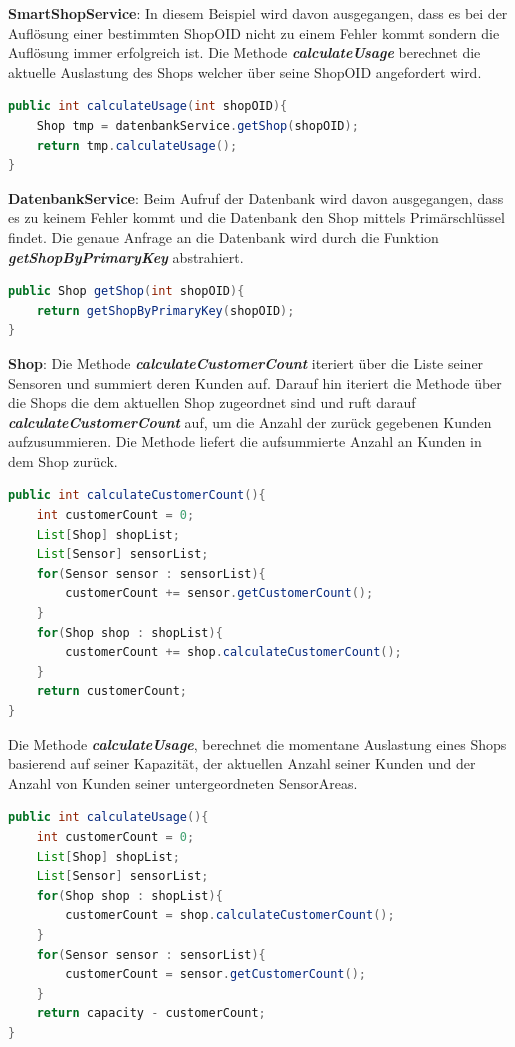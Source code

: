\documentclass[runningheads]{llncs}
\begin{document}
\textbf{SmartShopService}: In diesem Beispiel wird davon ausgegangen, dass es bei der Auflösung einer bestimmten ShopOID nicht zu einem Fehler kommt sondern die Auflösung immer erfolgreich ist.
Die Methode \textbf{\textit{calculateUsage}} berechnet die aktuelle Auslastung des Shops welcher über seine ShopOID angefordert wird.
\begin{lstlisting}[language=Java, basicstyle=\scriptsize]
public int calculateUsage(int shopOID){
	Shop tmp = datenbankService.getShop(shopOID);
	return tmp.calculateUsage();
}
\end{lstlisting}


\textbf{DatenbankService}: Beim Aufruf der Datenbank wird davon ausgegangen, dass es zu keinem Fehler kommt und die Datenbank den Shop mittels Primärschlüssel findet.
Die genaue Anfrage an die Datenbank wird durch die Funktion \textbf{\textit{getShopByPrimaryKey}} abstrahiert.
\begin{lstlisting}[language=Java, basicstyle=\scriptsize]
public Shop getShop(int shopOID){
	return getShopByPrimaryKey(shopOID);
}
\end{lstlisting}

\break
\textbf{Shop}: Die Methode \textbf{\textit{calculateCustomerCount}} iteriert über die Liste seiner Sensoren und summiert deren Kunden auf.
Darauf hin iteriert die Methode über die Shops die dem aktuellen Shop zugeordnet sind und ruft darauf \textbf{\textit{calculateCustomerCount}} auf, um die Anzahl der zurück gegebenen Kunden aufzusummieren.
Die Methode liefert die aufsummierte Anzahl an Kunden in dem Shop zurück.
\begin{lstlisting}[language=Java, basicstyle=\scriptsize]
public int calculateCustomerCount(){
	int customerCount = 0;
	List[Shop] shopList;
	List[Sensor] sensorList;
	for(Sensor sensor : sensorList){
		customerCount += sensor.getCustomerCount();
	}
	for(Shop shop : shopList){
		customerCount += shop.calculateCustomerCount();
	}
	return customerCount;
}
\end{lstlisting}

Die Methode \textbf{\textit{calculateUsage}}, berechnet die momentane Auslastung eines Shops basierend auf seiner Kapazität, der aktuellen Anzahl seiner Kunden und der Anzahl von Kunden seiner untergeordneten SensorAreas.
\begin{lstlisting}[language=Java, basicstyle=\scriptsize]
public int calculateUsage(){
	int customerCount = 0;
	List[Shop] shopList;
	List[Sensor] sensorList;
	for(Shop shop : shopList){
		customerCount = shop.calculateCustomerCount();
	}
	for(Sensor sensor : sensorList){
		customerCount = sensor.getCustomerCount();
	}
	return capacity - customerCount;
}
\end{lstlisting}
\end{document}

